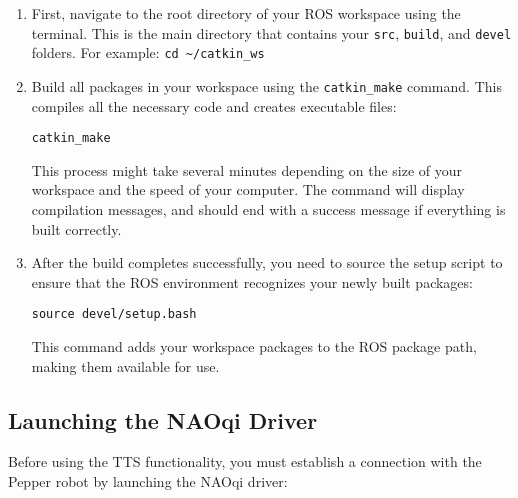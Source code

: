 \documentclass{CSSRforAfrica}
\begin{document}
\begin{enumerate}
    \item First, navigate to the root directory of your ROS workspace using the terminal. This is the main directory that contains your \texttt{src}, \texttt{build}, and \texttt{devel} folders. For example: \texttt{cd \textasciitilde/catkin\_ws}

    \item Build all packages in your workspace using the \texttt{catkin\_make} command. This compiles all the necessary code and creates executable files:
    \begin{lstlisting}[style=commandstyle]
    catkin_make
    \end{lstlisting}
    This process might take several minutes depending on the size of your workspace and the speed of your computer. The command will display compilation messages, and should end with a success message if everything is built correctly.

    \item After the build completes successfully, you need to source the setup script to ensure that the ROS environment recognizes your newly built packages:
    \begin{lstlisting}[style=commandstyle]
    source devel/setup.bash
    \end{lstlisting}

    This command adds your workspace packages to the ROS package path, making them available for use.
\end{enumerate}

\subsection{Launching the NAOqi Driver}

Before using the TTS functionality, you must establish a connection with the Pepper robot by launching the NAOqi driver:
\end{document}
